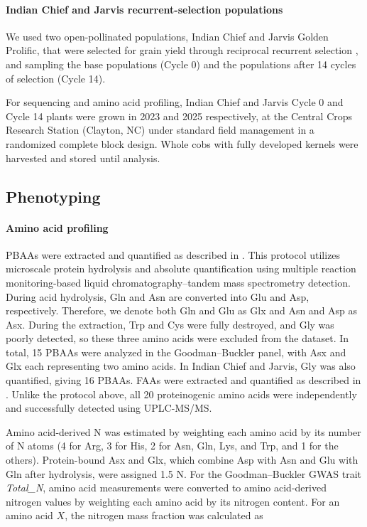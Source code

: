 \documentclass[11pt]{article}
\begin{document}
\paragraph*{Indian Chief and Jarvis recurrent-selection populations}
We used two open-pollinated populations, Indian Chief and Jarvis Golden Prolific, that were selected for grain yield through reciprocal recurrent selection \citep{MollStuber1971,Moll1994}, and sampling the base populations (Cycle 0) and the populations after 14 cycles of selection (Cycle 14).

For sequencing and amino acid profiling, Indian Chief and Jarvis Cycle 0 and Cycle 14 plants were grown in 2023 and 2025 respectively, at the Central Crops Research Station (Clayton, NC) under standard field management in a randomized complete block design. Whole cobs with fully developed kernels were harvested and stored until analysis.

\subsection*{Phenotyping}

\paragraph*{Amino acid profiling}
PBAAs were extracted and quantified as described in \cite{Yobi2018PBAA}. This protocol utilizes microscale protein hydrolysis and absolute quantification using multiple reaction monitoring-based liquid chromatography–tandem mass spectrometry detection. During acid hydrolysis, Gln and Asn are converted into Glu and Asp, respectively. Therefore, we denote both Gln and Glu as Glx and Asn and Asp as Asx. During the extraction, Trp and Cys were fully destroyed, and Gly was poorly detected, so these three amino acids were excluded from the dataset. In total, 15 PBAAs were analyzed in the Goodman--Buckler panel, with Asx and Glx each representing two amino acids. In Indian Chief and Jarvis, Gly was also quantified, giving 16 PBAAs. FAAs were extracted and quantified as described in \citet{Gu2007LCMS}. Unlike the protocol above, all 20 proteinogenic amino acids were independently and successfully detected using UPLC-MS/MS.

Amino acid-derived N was estimated by weighting each amino acid by its number of N atoms (4 for Arg, 3 for His, 2 for Asn, Gln, Lys, and Trp, and 1 for the others). Protein-bound Asx and Glx, which combine Asp with Asn and Glu with Gln after hydrolysis, were assigned 1.5 N. For the Goodman--Buckler GWAS trait \textit{Total\_N}, amino acid measurements were converted to amino acid-derived nitrogen values by weighting each amino acid by its nitrogen content. For an amino acid $X$, the nitrogen mass fraction was calculated as
\end{document}
